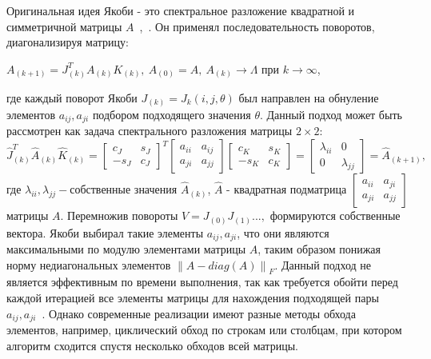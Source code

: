  Оригинальная идея Якоби - это спектральное разложение квадратной и симметричной матрицы $A$~\cite{10.5555/867597},~\cite{Golub2013}. Он применял последовательность поворотов, диагонализируя матрицу:
 \begin{center}
    $A_{(k+1)} = J^T_{(k)}A_{(k)}K_{(k)}, \ A_{(0)}= A, \ A_{(k)}\longrightarrow\Lambda \text{ при } k\to\infty$,
\end{center}
 где каждый поворот Якоби $J_{(k)} = J_{k}(i,j,\theta)$ был направлен на обнуление элементов $a_{ij}, a_{ji}$ подбором подходящего значения $\theta$. Данный подход может быть рассмотрен как задача спектрального разложения матрицы $2\times2$:
 \begin{equation} \label{original Jacobi}
    \hat{J}_{(k)}^T\hat{A}_{(k)}\hat{K}_{(k)} = \begin{bmatrix}
        c_J&s_J\\
        -s_J&c_J
    \end{bmatrix}^T
    \begin{bmatrix}
        a_{ii}&a_{ij}\\
        a_{ji}&a_{jj}
    \end{bmatrix}
    \begin{bmatrix}
        c_K&s_K\\
        -s_K&c_K
    \end{bmatrix} = \begin{bmatrix}
        \lambda_{ii} & 0\\
        0 & \lambda_{jj}
    \end{bmatrix} = \hat{A}_{(k+1)},
\end{equation}
где $\lambda_{ii}, \lambda_{jj} -\text{собственные значения } \hat{A}_{(k)}$, $\hat{A}$ - квадратная подматрица $\begin{bmatrix}
    a_{ii}&a_{ji}\\
    a_{ji}&a_{jj}
\end{bmatrix}$ матрицы $A$. Перемножив повороты $V = J_{(0)}J_{(1)}...,$ формируются собственные вектора.
Якоби выбирал такие элементы $a_{ij}, a_{ji}$, что они являются максимальными по модулю элементами матрицы $A$, таким образом понижая норму недиагональных элементов $\left\| A - diag(A) \right\|_F$. Данный подход не является эффективным по времени выполнения, так как требуется обойти перед каждой итерацией все элементы матрицы для нахождения подходящей пары $a_{ij}, a_{ji}$~\cite{Dongarra2018}. Однако современные реализации имеют разные методы обхода элементов, например, циклический обход по строкам или столбцам, при котором алгоритм сходится спустя несколько обходов всей матрицы.

